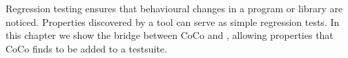 \chapstart Regression testing ensures that behavioural changes in a program or
library are noticed.  Properties discovered by a tool can serve as simple
regression tests.  In this chapter we show the bridge between CoCo and
\dejafu{}, allowing properties that CoCo finds to be added to a \dejafu{}
testsuite.
